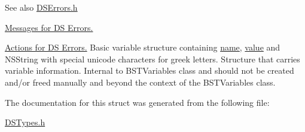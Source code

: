 \begin{DoxySeeAlso}{See also}
\hyperlink{_d_s_errors_8h}{DSErrors.h}

\hyperlink{group___m___d_s___messages}{Messages for DS Errors.} 

\hyperlink{group___a___d_s___actions}{Actions for DS Errors.} Basic variable structure containing \hyperlink{struct_d_s_variable_a5ac083a645d964373f022d03df4849c8}{name}, \hyperlink{struct_d_s_variable_aee90379adb0307effb138f4871edbc5c}{value} and NSString with special unicode characters for greek letters. Structure that carries variable information. Internal to BSTVariables class and should not be created and/or freed manually and beyond the context of the BSTVariables class. 
\end{DoxySeeAlso}


The documentation for this struct was generated from the following file:\begin{DoxyCompactItemize}
\item 
\hyperlink{_d_s_types_8h}{DSTypes.h}\end{DoxyCompactItemize}
